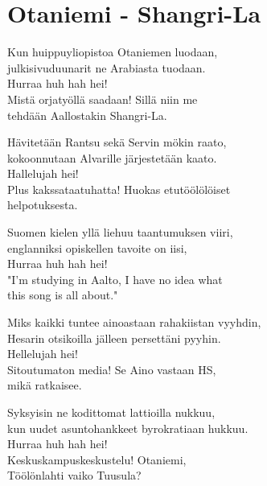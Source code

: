 \section{Otaniemi - Shangri-La}
Kun huippuyliopistoa Otaniemen luodaan,\\
julkisivuduunarit ne Arabiasta tuodaan.\\
Hurraa huh hah hei!\\
Mistä orjatyöllä saadaan! Sillä niin me\\
tehdään Aallostakin Shangri-La.

Hävitetään Rantsu sekä Servin mökin raato,\\
kokoonnutaan Alvarille järjestetään kaato.\\
Hallelujah hei!\\
Plus kakssataatuhatta! Huokas etutöölölöiset\\
helpotuksesta.

Suomen kielen yllä liehuu taantumuksen viiri,\\
englanniksi opiskellen tavoite on iisi,\\
Hurraa huh hah hei!\\
"I'm studying in Aalto, I have no idea what\\
this song is all about."

Miks kaikki tuntee ainoastaan rahakiistan vyyhdin,\\
Hesarin otsikoilla jälleen persettäni pyyhin.\\
Hellelujah hei!\\
Sitoutumaton media! Se Aino vastaan HS,\\
mikä ratkaisee.

Syksyisin ne kodittomat lattioilla nukkuu,\\
kun uudet asuntohankkeet byrokratiaan hukkuu.\\
Hurraa huh hah hei!\\
Keskuskampuskeskustelu! Otaniemi,\\
Töölönlahti vaiko Tuusula?